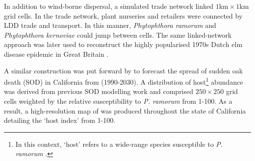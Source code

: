 In addition to wind-borne dispersal, a simulated trade network linked $\mathrm{1km \times 1km}$ grid cells. 
In the trade network, plant nurseries and retailers were connected by LDD trade and transport. 
In this manner, \textit{Phytophthora ramorum} and \textit{Phytophthora kernoviae} could jump 
between cells. The same linked-network approach was later used to reconstruct the highly 
popularised 1970s Dutch elm disease epidemic in Great Britain \cite{doi:10.1111/j.1365-3059.2010.02391.x, potter2011learning}.

A similar construction was put forward by \cite{meentemeyer2011epidemiological} to 
forecast the spread of sudden oak death (SOD) in California from (1990-2030).
A distribution of host\footnote{In this context, `host' refers to a wide-range
species susceptible to \textit{P. ramorum} \cite{tooley2004susceptibility}.
} abundance was derived from previous SOD modelling work 
\cite{meentemeyer2004mapping} and comprised $\mathrm{250 \times 250}$ grid cells
weighted by the relative susceptibility to \textit{P. ramorum} from 1-100. As a result,
a high-resolution map of was produced throughout the state of California detailing the `host index'
from 1-100.

